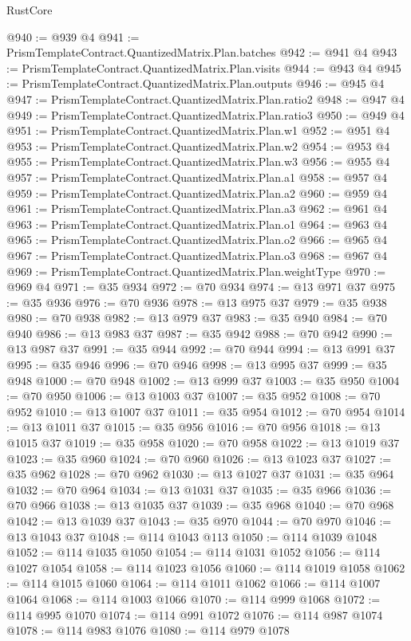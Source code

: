 \begin{lexlean}{RustCore}
\begin{coremodule}
@940 := @939 @4
@941 := PrismTemplateContract.QuantizedMatrix.Plan.batches
@942 := @941 @4
@943 := PrismTemplateContract.QuantizedMatrix.Plan.visits
@944 := @943 @4
@945 := PrismTemplateContract.QuantizedMatrix.Plan.outputs
@946 := @945 @4
@947 := PrismTemplateContract.QuantizedMatrix.Plan.ratio2
@948 := @947 @4
@949 := PrismTemplateContract.QuantizedMatrix.Plan.ratio3
@950 := @949 @4
@951 := PrismTemplateContract.QuantizedMatrix.Plan.w1
@952 := @951 @4
@953 := PrismTemplateContract.QuantizedMatrix.Plan.w2
@954 := @953 @4
@955 := PrismTemplateContract.QuantizedMatrix.Plan.w3
@956 := @955 @4
@957 := PrismTemplateContract.QuantizedMatrix.Plan.a1
@958 := @957 @4
@959 := PrismTemplateContract.QuantizedMatrix.Plan.a2
@960 := @959 @4
@961 := PrismTemplateContract.QuantizedMatrix.Plan.a3
@962 := @961 @4
@963 := PrismTemplateContract.QuantizedMatrix.Plan.o1
@964 := @963 @4
@965 := PrismTemplateContract.QuantizedMatrix.Plan.o2
@966 := @965 @4
@967 := PrismTemplateContract.QuantizedMatrix.Plan.o3
@968 := @967 @4
@969 := PrismTemplateContract.QuantizedMatrix.Plan.weightType
@970 := @969 @4
@971 := @35 @934
@972 := @70 @934
@974 := @13 @971 @37
@975 := @35 @936
@976 := @70 @936
@978 := @13 @975 @37
@979 := @35 @938
@980 := @70 @938
@982 := @13 @979 @37
@983 := @35 @940
@984 := @70 @940
@986 := @13 @983 @37
@987 := @35 @942
@988 := @70 @942
@990 := @13 @987 @37
@991 := @35 @944
@992 := @70 @944
@994 := @13 @991 @37
@995 := @35 @946
@996 := @70 @946
@998 := @13 @995 @37
@999 := @35 @948
@1000 := @70 @948
@1002 := @13 @999 @37
@1003 := @35 @950
@1004 := @70 @950
@1006 := @13 @1003 @37
@1007 := @35 @952
@1008 := @70 @952
@1010 := @13 @1007 @37
@1011 := @35 @954
@1012 := @70 @954
@1014 := @13 @1011 @37
@1015 := @35 @956
@1016 := @70 @956
@1018 := @13 @1015 @37
@1019 := @35 @958
@1020 := @70 @958
@1022 := @13 @1019 @37
@1023 := @35 @960
@1024 := @70 @960
@1026 := @13 @1023 @37
@1027 := @35 @962
@1028 := @70 @962
@1030 := @13 @1027 @37
@1031 := @35 @964
@1032 := @70 @964
@1034 := @13 @1031 @37
@1035 := @35 @966
@1036 := @70 @966
@1038 := @13 @1035 @37
@1039 := @35 @968
@1040 := @70 @968
@1042 := @13 @1039 @37
@1043 := @35 @970
@1044 := @70 @970
@1046 := @13 @1043 @37
@1048 := @114 @1043 @113
@1050 := @114 @1039 @1048
@1052 := @114 @1035 @1050
@1054 := @114 @1031 @1052
@1056 := @114 @1027 @1054
@1058 := @114 @1023 @1056
@1060 := @114 @1019 @1058
@1062 := @114 @1015 @1060
@1064 := @114 @1011 @1062
@1066 := @114 @1007 @1064
@1068 := @114 @1003 @1066
@1070 := @114 @999 @1068
@1072 := @114 @995 @1070
@1074 := @114 @991 @1072
@1076 := @114 @987 @1074
@1078 := @114 @983 @1076
@1080 := @114 @979 @1078

\end{coremodule}
\end{lexlean}

